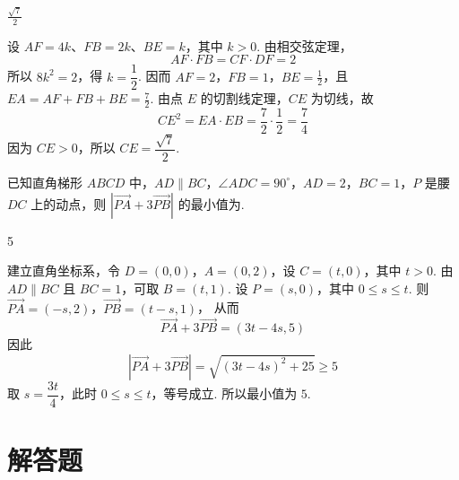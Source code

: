\begin{answer}
\(\frac{\sqrt{7}}{2}\)
\end{answer}

\begin{solution}
设 \(AF=4k\)、\(FB=2k\)、\(BE=k\)，其中 \(k>0\). 由相交弦定理，
\[
AF\cdot FB=CF\cdot DF=2
\]
所以 \(8k^2=2\)，得 \(k=\dfrac12\). 因而 \(AF=2\)，\(FB=1\)，\(BE=\frac12\)，且 \(EA=AF+FB+BE=\frac72\).
由点 \(E\) 的切割线定理，\(CE\) 为切线，故
\[
CE^2=EA\cdot EB=\frac72\cdot\frac12=\frac74
\]
因为 \(CE>0\)，所以 \(CE=\dfrac{\sqrt7}{2}\).
\end{solution}

\begin{problem}
已知直角梯形 \(ABCD\) 中，\(AD \parallel BC\)，\(\angle ADC = 90^{\circ}\)，\(AD = 2\)，\(BC = 1\)，\(P\) 是腰 \(DC\) 上的动点，则 \(\left|\overrightarrow{PA}+3\overrightarrow{PB}\right|\) 的最小值为\fillinblank{}.
\end{problem}

\begin{answer}
5
\end{answer}

\begin{solution}
建立直角坐标系，令 \(D=(0,0)\)，\(A=(0,2)\)，设 \(C=(t,0)\)，其中 \(t>0\). 由 \(AD\parallel BC\) 且 \(BC=1\)，可取 \(B=(t,1)\). 设 \(P=(s,0)\)，其中 \(0\leqslant s\leqslant t\). 则 \(\overrightarrow{PA}=(-s,2)\)，\(\overrightarrow{PB}=(t-s,1)\)，
从而
\[
\overrightarrow{PA}+3\overrightarrow{PB}=(3t-4s,5)
\]
因此
\[
\left|\overrightarrow{PA}+3\overrightarrow{PB}\right|
=\sqrt{(3t-4s)^2+25}\geqslant5
\]
取 \(s=\dfrac{3t}{4}\)，此时 \(0\leqslant s\leqslant t\)，等号成立. 所以最小值为 \(5\).
\end{solution}

\section{解答题}


